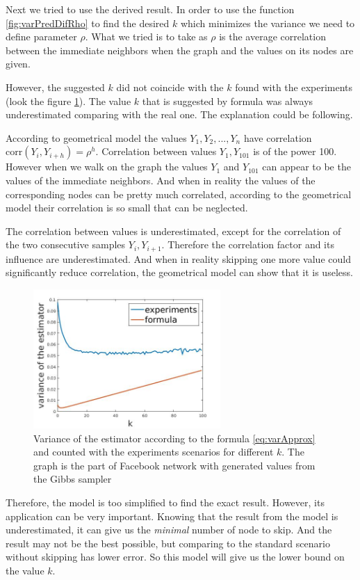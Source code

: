 \documentclass[12pt]{report}
\begin{document}
Next we tried to use the derived result. In order to use the function \ref{fig:varPredDifRho} to find the desired $k$ which minimizes the variance we need to define parameter $\rho$. What we tried is to take as $\rho$ is the average correlation between the immediate neighbors when the graph and the values on its nodes are given.

However, the suggested $k$ did not coincide with the $k$ found with the experiments (look the figure \ref{fig:facebookBad}). The value $k$ that is suggested by formula was always underestimated comparing with the real one. The explanation could be following. 

According to geometrical model the values $Y_1, Y_2, ..., Y_n$ have correlation $\mathrm{corr}(Y_i, Y_{i+h}) = \rho^h$. Correlation between values $Y_1, Y_{101}$ is of the power 100. However when we walk on the graph the values $Y_1$ and $Y_{101}$ can appear to be the values of the immediate neighbors. And when in reality the values of the corresponding nodes can be pretty much correlated, according to the geometrical model their correlation is so small that can be neglected.

The correlation between values is underestimated, except for the correlation of the two consecutive samples $Y_i, Y_{i+1}$. Therefore the correlation factor and its influence are underestimated. And when in reality skipping one more value could significantly reduce correlation,  the geometrical model can show that it is useless.

\begin{figure}[ht]
    \centering
    \includegraphics[height=200px]{facebookBad}
    \caption{Variance of the estimator according to the formula \ref{eq:varApprox} and counted with the experiments scenarios for different $k$. The graph is the part of Facebook network \cite{Facebook} with generated values from the Gibbs sampler}
    \label{fig:facebookBad}
\end{figure}

Therefore, the model is too simplified to find the exact result. However, its application can be very important. Knowing that the result from the model is underestimated, it can give us the \textit{minimal} number of node to skip. And the result may not be the best possible, but comparing to the standard scenario without skipping has lower error. So this model will give us the lower bound on the value $k$.
\end{document}
